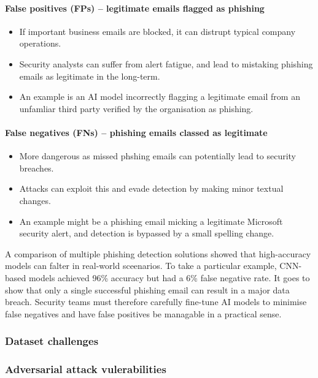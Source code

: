 \paragraph{False positives (FPs) -- legitimate emails flagged as phishing}
\begin{itemize}
    \item If important business emails are blocked, it can distrupt typical company operations.
    \item Security analysts can suffer from alert fatigue, and lead to mistaking phishing emails as legitimate in the long-term.
    \item An example is an AI model incorrectly flagging a legitimate email from an unfamliar third party verified by the organisation as phishing.
\end{itemize}

\paragraph{False negatives (FNs) -- phishing emails classed as legitimate}
\begin{itemize}
    \item More dangerous as missed phshing emails can potentially lead to security breaches.
    \item Attacks can exploit this and evade detection by making minor textual changes.
    \item An example might be a phishing email micking a legitimate Microsoft security alert, and detection is bypassed by a small spelling change.
\end{itemize}

A comparison of multiple phishing detection solutions showed that high-accuracy models can falter in real-world sceenarios. To take a particular example, CNN-based models achieved 96\% accuracy but had a 6\% false negative rate. It goes to show that only a single successful phishing email can result in a major data breach. Security teams must therefore carefully fine-tune AI models to minimise false negatives and have false positives be managable in a practical sense.

\subsubsection*{Dataset challenges}

\subsubsection*{Adversarial attack vulerabilities}

